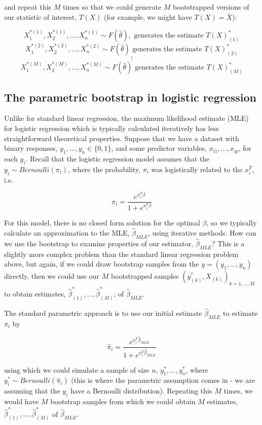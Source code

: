 and repeat this $M$ times so that we could generate $M$ bootstrapped versions of our statistic of interest, $T(X)$ (for example, we might have $T(X) = \bar{X}$):


$$X_1^{*(1)}, X_2^{*(1)}, ..., X_n^{*(1)} \sim F(\hat{\theta}), \text{ generates the estimate } T(X)_{(1)}^{*}$$
$$X_1^{*(2)}, X_2^{*(2)}, ..., X_n^{*(2)} \sim F(\hat{\theta})\text{ generates the estimate } T(X)_{(2)}^{*}$$
$$ \vdots $$
$$X_1^{*(M)}, X_2^{*(M)}, ..., X_n^{*(M)} \sim F(\hat{\theta})\text{ generates the estimate } T(X)_{(M)}^{*}$$



\subsection*{The parametric bootstrap in logistic regression}

Unlike for standard linear regression, the maximum likelihood estimate (MLE) for logistic regression which is typically calculated iteratively has less straightforward theoretical properties. Suppose that we have a dataset with binary responses, $y_1, ..., y_n \in \{0, 1\}$, and some predictor variables, $x_{i1}, ..., x_{ip}$, for each $y_i$. Recall that the logistic regression model assumes that the $y_i \sim Bernoulli(\pi_i)$, where the probability, $\pi_i$ was logistically related to the $x_i^T$, i.e.

$$\pi_i = \frac{e^{x_i^T\beta}}{1 + e^{x_i^T\beta}}$$

For this model, there is no closed form solution for the optimal $\beta$, so we typically calculate an approximation to the MLE, $\hat{\beta}_{MLE}$, using iterative methods. How can we use the bootstrap to examine properties of our estimator, $\hat{\beta}_{MLE}$? This is a slightly more complex problem than the standard linear regression problem above, but again, if we could draw bootstrap samples from the $y = (y_1, ..., y_n)$ directly, then we could use our $M$ bootstrapped samples $(y^*_{(k)}, X_{(k)})_{k = 1, ..., M}$ to obtain estimates, $\hat{\beta}^*_{(1)},..., \hat{\beta}^*_{(M)}$, of $\hat{\beta}_{MLE}$.


The standard parametric approach is to use our initial estimate $\hat{\beta}_{MLE}$ to estimate $\pi_i$ by

$$\hat{\pi}_i = \frac{e^{x_i^T\hat{\beta}_{MLE}}}{1 + e^{x_i^T\hat{\beta}_{MLE}}}$$

using which we could simulate a sample of size $n$, $y_1^*, ..., y_n^*$, where $y_i^* \sim Bernoulli(\hat{\pi}_i)$ (this is where the parametric assumption comes in - we are assuming that the $y_i$ have a Bernoulli distribution). Repeating this $M$ times, we would have $M$ bootstrap samples from which we could obtain $M$ estimates, $\hat{\beta}^*_{(1)}, ..., \hat{\beta}^*_{(M)}$ of $\hat{\beta}_{MLE}$.

